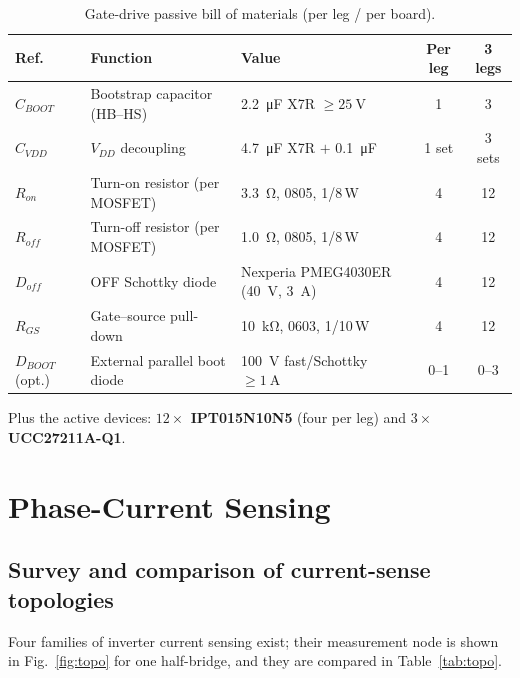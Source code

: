 \documentclass[journal,onecolumn,11pt]{IEEEtran}
\begin{document}
\begin{table}[!t]
\centering
\caption{Gate-drive passive bill of materials (per leg / per board).}
\label{tab:gdbom}
\renewcommand{\arraystretch}{1.2}
\begin{tabularx}{\textwidth}{@{}l L L c c@{}}
\toprule
\textbf{Ref.} & \textbf{Function} & \textbf{Value} & \textbf{Per leg} & \textbf{3 legs} \\
\midrule
$C_{BOOT}$ & Bootstrap capacitor (HB--HS) & \SI{2.2}{\micro\farad} X7R $\ge\SI{25}{\volt}$ & 1 & 3 \\
$C_{VDD}$ & $V_{DD}$ decoupling & \SI{4.7}{\micro\farad} X7R $+$ \SI{0.1}{\micro\farad} & 1 set & 3 sets \\
$R_{on}$ & Turn-on resistor (per MOSFET) & \SI{3.3}{\ohm}, 0805, 1/8\,W & 4 & 12 \\
$R_{off}$ & Turn-off resistor (per MOSFET) & \SI{1.0}{\ohm}, 0805, 1/8\,W & 4 & 12 \\
$D_{off}$ & OFF Schottky diode & Nexperia PMEG4030ER (\SI{40}{\volt}, \SI{3}{\ampere}) & 4 & 12 \\
$R_{GS}$ & Gate--source pull-down & \SI{10}{\kilo\ohm}, 0603, 1/10\,W & 4 & 12 \\
$D_{BOOT}$ (opt.) & External parallel boot diode & \SI{100}{\volt} fast/Schottky $\ge\SI{1}{\ampere}$ & 0--1 & 0--3 \\
\bottomrule
\end{tabularx}
\end{table}

\noindent Plus the active devices: \textbf{$12\times$ IPT015N10N5} (four per leg) and
\textbf{$3\times$ UCC27211A-Q1}.

\section{Phase-Current Sensing}\label{sec:current}

\subsection{Survey and comparison of current-sense topologies}\label{sec:csurvey}
Four families of inverter current sensing exist; their measurement node is shown in
Fig.~\ref{fig:topo} for one half-bridge, and they are compared in Table~\ref{tab:topo}.
\end{document}
